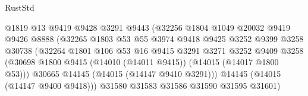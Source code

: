 \begin{lexlean}{RustStd}
\begin{coremodule}
                                        @1819
                                        @13
                                        @9419
                                        @9428
                                        @3291
                                        @9443
                                        (@32256
                                          @1804
                                          @1049
                                          @20032
                                          @9419
                                          @9426
                                          @8888
                                          (@32265
                                            @1803
                                            @53
                                            @55
                                            @3974
                                            @9418
                                            @9425
                                            @3252
                                            @9399
                                            @3258
                                            @30738
                                            (@32264
                                              @1801
                                              @106
                                              @53
                                              @16
                                              @9415
                                              @3291
                                              @3271
                                              @3252
                                              @9409
                                              @3258
                                              (@30698
                                                @1800
                                                @9415
                                                (@14010 (@14011 @9415))
                                                (@14015 (@14017 @1800 @53)))
                                              @30665
                                              @14145
                                              (@14015 (@14147 @9410 @3291)))
                                            @14145
                                            (@14015 (@14147 @9400 @9418)))
                                          @31580
                                          @31583
                                          @31586
                                          @31590
                                          @31595
                                          @31601)

\end{coremodule}
\end{lexlean}
